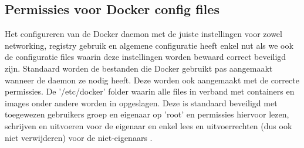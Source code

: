 \subsection{Permissies voor Docker config files}

Het configureren van de Docker daemon met de juiste instellingen voor zowel networking, registry gebruik en algemene configuratie heeft enkel nut als we ook de configuratie files waarin deze instellingen worden bewaard correct beveiligd zijn. Standaard worden de bestanden die Docker gebruikt pas aangemaakt wanneer de daemon ze nodig heeft. Deze worden ook aangemaakt met de correcte permissies. De '/etc/docker' folder waarin alle files in verband met containers en images onder andere worden in opgeslagen. Deze is standaard beveiligd met toegewezen gebruikers groep en eigenaar op 'root' en permissies hiervoor  lezen, schrijven en uitvoeren voor de eigenaar en enkel lees en uitvoerrechten (dus ook niet verwijderen) voor de niet-eigenaars \cite{Shotts2016}.

